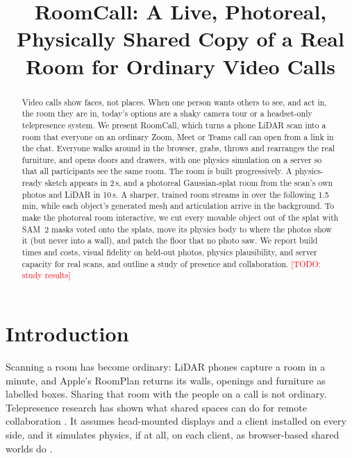 \documentclass[sigconf,review,anonymous]{acmart}
\newcommand{\todo}[1]{\textcolor{red}{[TODO: #1]}}
\newcommand{\measured}[1]{#1}
\newcommand{\sys}{RoomCall}
\begin{document}
\title{\sys: A Live, Photoreal, Physically Shared Copy of a Real Room for Ordinary Video Calls}

\begin{abstract}
Video calls show faces, not places. When one person wants others to see, and act in, the room
they are in, today's options are a shaky camera tour or a headset-only telepresence system.
We present \sys, which turns a phone LiDAR scan into a room that everyone on an ordinary Zoom,
Meet or Teams call can open from a link in the chat. Everyone walks around in the browser, grabs,
throws and rearranges the real furniture, and opens doors and drawers, with one physics
simulation on a server so that all participants see the same room. The room is built
progressively. A physics-ready sketch appears in \measured{2\,s}, and a photoreal Gaussian-splat
room from the scan's own photos and LiDAR in \measured{10\,s}. A sharper, trained room streams
in over the following \measured{1.5\,min}, while each object's generated mesh and articulation
arrive in the background. To make the photoreal room interactive, we cut every movable object
out of the splat with SAM~2 masks voted onto the splats, move its physics body to where the
photos show it (but never into a wall), and patch the floor that no photo saw. We report build
times and costs, visual fidelity on held-out photos, physics plausibility, and server capacity
for real scans, and outline a study of presence and collaboration.
\todo{study results}
\end{abstract}

\maketitle

\section{Introduction}
Scanning a room has become ordinary: LiDAR phones capture a room in a minute, and Apple's
RoomPlan returns its walls, openings and furniture as labelled boxes. Sharing that room with
the people on a call is not ordinary. Telepresence research has shown what shared spaces can do
for remote collaboration \cite{virtualnexus,gaussiannexus,avatarpilot}. It assumes head-mounted
displays and a client installed on every side, and it simulates physics, if at all, on each
client, as browser-based shared worlds do \cite{hubs,croquet}.
\end{document}
